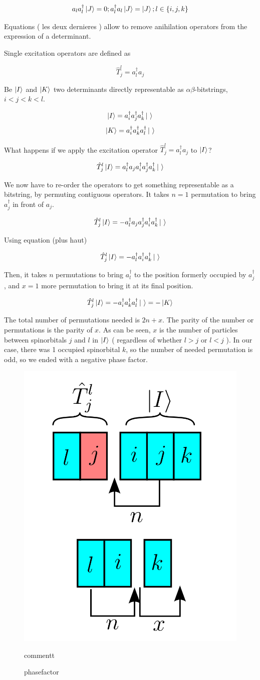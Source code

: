 $$a_l a^\dagger_l \ket J  = 0 ; a^\dagger_l a_l \ket J  = \ket J; l \in \{i,j,k\}$$


Equations ( les deux dernieres ) allow to remove anihilation operators from the expression of a determinant.



Single excitation operators are defined as

$$\hat T_j^l=a^\dagger_l a_j$$

Be $\ket I$ and $\ket K$ two determinants directly representable as $\alpha \beta$-bitstrings, $i<j<k<l$.

$$\ket I = a^\dagger_i a^\dagger_j a^\dagger_k \ket \ $$
$$\ket K = a^\dagger_i a^\dagger_k a^\dagger_l \ket \  $$


What happens if we apply the excitation operator $\hat T_j^l=a^\dagger_l a_j$ to $\ket I$?


$$\hat T_j^l \ket I = a^\dagger_l a_j a^\dagger_i a^\dagger_j a^\dagger_k \ket \ $$

We now have to re-order the operators to get something representable as a bitstring, by permuting contiguous operators. It takes $n=1$ permutation to bring $a^\dagger_j$ in front of $a_j$.


$$\hat T_j^l \ket I = -a^\dagger_l a_j a^\dagger_j a^\dagger_i a^\dagger_k \ket \ $$

Using equation (plus haut)

$$\hat T_j^l \ket I = -a^\dagger_l a^\dagger_i a^\dagger_k \ket \ $$

Then, it takes $n$ permutations to bring $a^\dagger_l$ to the position formerly occupied by $a^\dagger_j$, and $x=1$ more permutation to bring it at its final position.

$$\hat T_j^l \ket I = -a^\dagger_i a^\dagger_k a^\dagger_l \ket \  = -\ket K$$

The total number of permutations needed is $2n+x$. The parity of the number or permutations is the parity of $x$. As can be seen, $x$ is the number of particles between spinorbitals $j$ and $l$ in $\ket I$ ( regardless of whether $l>j$ or $l<j$ ). In our case, there was 1 occupied spinorbital $k$, so the number of needed permutation is odd, so we ended with a negative phase factor.

\begin{figure}[h!]
	\begin{center}
		\includegraphics[width=0.3\columnwidth]{figures/determinant_driven/phasefactor}
		\caption{
		\label{phasefactor}%
		phasefactor
		}
		commentt
	\end{center}
\end{figure}

